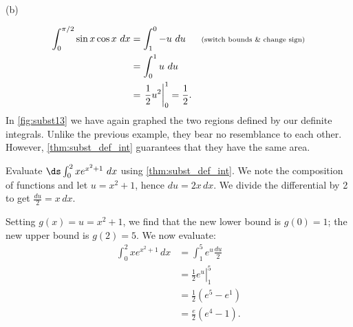 \begin{example}
{
\\(b)}
%
\begin{align*}
	\int_0^{\pi/2} \sin x\cos x\ dx
	&= \int_1^0 -u\ du && \text{\scriptsize (switch bounds \& change sign)}\\
	&= \int_0^1 u\ du\\
	&= \left.\frac12u^2\right|_0^1= \frac12.
\end{align*}
In \autoref{fig:subst13} we have again graphed the two regions defined by our definite integrals. Unlike the previous example, they bear no resemblance to each other. However, \autoref{thm:subst_def_int} guarantees that they have the same area.
\end{example}

\begin{example}\label{ex_subst_def_3}
Evaluate $\ds\int_0^2 xe^{x^2+1}\ dx$ using \autoref{thm:subst_def_int}.
\solution
We note the composition of functions and let $u=x^2+1$, hence $du=2x\,dx$. We divide the differential by 2 to get $\frac{du}2=x\,dx$.

Setting $g(x)=u=x^2+1$, we find that the new lower bound is $g(0)=1$; the new upper bound is $g(2)=5$. We now evaluate:
\begin{align*}
	\int_0^2 xe^{x^2+1}\,dx
	&= \int_1^5 e^u \frac{du}2\\
	&= \left.\frac12 e^u\right|_1^5\\
	&= \frac12(e^5-e^1) \\
	&= \frac e2(e^4-1). %
\end{align*}
\end{example}



